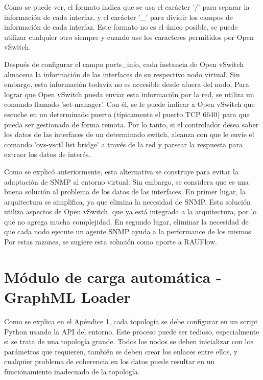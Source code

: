 Como se puede ver, el formato indica que se usa el carácter '/' para separar la información de cada interfaz, y el carácter '\_' para dividir los campos de información de cada interfaz. Este formato no es el único posible, se puede utilizar cualquier otro siempre y cuando use los caracteres permitidos por Open vSwitch.

Después de configurar el campo ports\_info, cada instancia de Open vSwitch almacena la información de las interfaces de su respectivo nodo virtual. Sin embargo, esta información todavía no es accesible desde afuera del nodo. Para lograr que Open vSwitch pueda enviar esta información por la red, se utiliza un comando llamado 'set-manager'. Con él, se le puede indicar a Open vSwitch que escuche en un determinado puerto (típicamente el puerto TCP 6640) para que pueda ser gestionado de forma remota. Por lo tanto, si el controlador desea saber los datos de las interfaces de un determinado switch, alcanza con que le envíe el comando 'ovs-vsctl list bridge' a través de la red y parsear la respuesta para extraer los datos de interés.

Como se explicó anteriormente, esta alternativa se construye para evitar la adaptación de SNMP al entorno virtual. Sin embargo, se considera que es una buena solución al problema de los datos de las interfaces. En primer lugar, la arquitectura se simplifica, ya que elimina la necesidad de SNMP. Esta solución utiliza aspectos de Open vSwitch, que ya está integrada a la arquitectura, por lo que no agrega mucha complejidad. En segundo lugar, eliminar la necesidad de que cada nodo ejecute un agente SNMP ayuda a la performance de los mismos. Por estas razones, se sugiere esta solución como aporte a RAUFlow.

\section{Módulo de carga automática - GraphML Loader}
Como se explica en el Apéndice 1, cada topología se debe configurar en un script Python usando la API del entorno. Este proceso puede ser tedioso, especialmente si se trata de una topología grande. Todos los nodos se deben inicializar con los parámetros que requieren, también se deben crear los enlaces entre ellos, y cualquier problema de coherencia en los datos puede resultar en un funcionamiento inadecuado de la topología.

